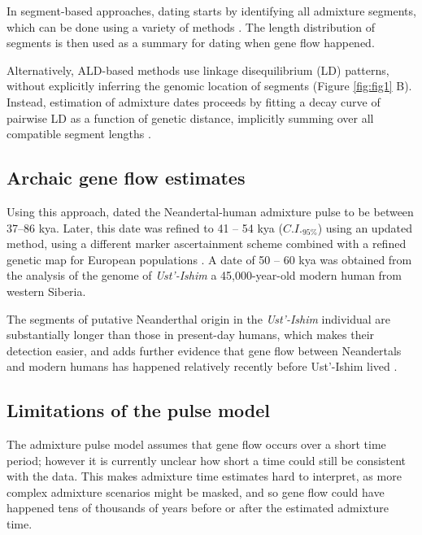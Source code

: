 \documentclass[]{article}
\begin{document}
In segment-based approaches, dating starts by identifying all admixture segments, which can be done using a variety of methods \citep{seguin_orlando_paleogenomics_2014,sankararaman_combined_2016,vernot_excavating_2016,racimo_signatures_2017,skov_detecting_2018}. The length distribution of segments is then used as a summary for dating when gene flow happened.

Alternatively, ALD-based methods use linkage disequilibrium (LD) patterns, without explicitly inferring the genomic location of segments \citep{chimusa_dating_2018} (Figure \ref{fig:fig1} B). Instead, estimation of admixture dates proceeds by fitting a decay curve of pairwise LD as a function of genetic distance, implicitly summing over all compatible segment lengths \citep{moorjani_history_2011,loh_inferring_2013}. 


\subsection{Archaic gene flow estimates}
Using this approach,   \cite{sankararaman_date_2012} dated the Neandertal-human admixture pulse to be  between 37--86 kya. Later, this date was refined to 41 -- 54 kya ($C.I._{95\%}$) using an updated method, using a different marker ascertainment scheme combined with a refined genetic map for European populations \citep{moorjani_genetic_2016}. A date of 50 -- 60 kya was obtained from the analysis of the genome of \textit{Ust'-Ishim} a 45,000-year-old modern human from western Siberia.

The segments of putative Neanderthal origin in the \textit{Ust'-Ishim} individual are substantially longer than those in present-day humans, which makes their detection easier, and adds further evidence that gene flow between Neandertals and modern humans has happened relatively recently before Ust'-Ishim lived \citep{fu_genome_2014}.


\subsection{Limitations of the pulse model}\label{Why can't we us the pulse model}

The admixture pulse model assumes that gene flow occurs over a short time period; however it is currently unclear how short a time could still be consistent with the data. This makes admixture time estimates hard to interpret, as more complex admixture scenarios might be masked, and so gene flow could have happened tens of thousands of years before or after the estimated admixture time.
\end{document}
